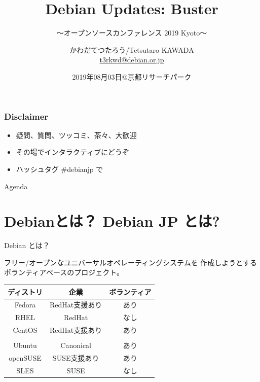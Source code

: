 \documentclass[cjk,c,squeeze,shrink,dvipdfmx,12pt]{beamer}
\title[Debian Updates: Buster]{Debian Updates: Buster}
\subtitle[OSC 2019 Kyoto]{〜オープンソースカンファレンス 2019 Kyoto〜}
\author[かわだ]{%
  かわだてつたろう/Tetsutaro KAWADA\\[1em]
  \href{mailto:t3rkwd@debian.or.jp}{t3rkwd@debian.or.jp}
}
\institute[Debian JP Project]{%
  {\footnotesize{%
      Debian JP Project/関西Debian勉強会
    }}
}
\date[2019/08/03]{%
  {\tiny{2019年08月03日@京都リサーチパーク}}
}
\begin{document}
\takahashi[80]{　}
{%
  \begin{frame}
    \maketitle
  \end{frame}
}

\begin{frame}[fragile]
  \frametitle{Disclaimer}
  \begin{itemize}
  \item 疑問、質問、ツッコミ、茶々、\alert{大歓迎}
  \item その場でインタラクティブにどうぞ
  \item ハッシュタグ \alert{\#debianjp} で
  \end{itemize}
\end{frame}

\begin{frame}[fragile]{Agenda}
  \tableofcontents
\end{frame}

\section{Debianとは？ Debian JP とは?}

\begin{frame}[fragile]{Debian とは？}

  \alert{フリー/オープン}な\alert{ユニバーサル}オペレーティングシステムを
  作成しようとするボランティアベースのプロジェクト。

  \vfill
  \centering
  \begin{tabular}{|c|c|c|}
    \hline
    ディストリ & 企業 & ボランティア \\ \hline
    Fedora & RedHat支援あり & あり  \\ \hline
    RHEL & RedHat & なし  \\ \hline
    CentOS & RedHat支援あり & あり \\ \hline
    \color{red}{Debian}  & \color{red}{なし} & \color{red}{あり} \\ \hline
    Ubuntu  & Canonical & あり \\ \hline
    openSUSE & SUSE支援あり & あり \\ \hline
    SLES & SUSE & なし \\ \hline
  \end{tabular}
  \vfill
\end{frame}
\end{document}
